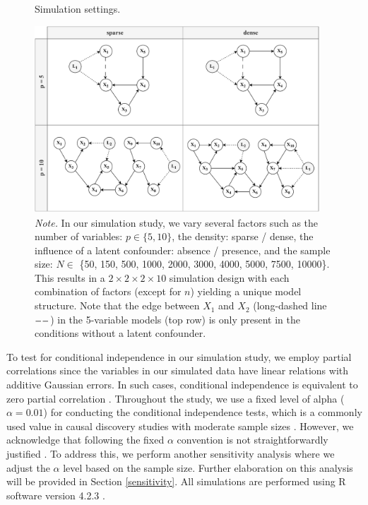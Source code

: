 \documentclass[twoside, 11pt]{article}
\newcommand{\thickdash}{%
\begin{tikzpicture}
[baseline=-0.7mm]
\draw [line width= 0.6pt, dash pattern={on 6pt off 2pt}] (0,0) -- (0.5,0);
\end{tikzpicture}
}
\begin{document}
\begin{figure}[!hb]
    \centering
        \caption{Simulation settings.}
        \includegraphics[width=0.95\textwidth]{figures/Fig11.pdf}
        \vspace*{1mm}
        \caption*{\small{\textit{Note.} In our simulation study, we vary several factors such as the number of variables: $p \in \{5, 10\}$, the density: sparse / dense, the influence of a latent confounder: absence / presence, and the sample size: $N \in$ \{50, 150, 500, 1000, 2000, 3000, 4000, 5000, 7500, 10000\}. This results in a $2 \times 2 \times 2 \times 10$ simulation design with each combination of factors (except for $n$) yielding a unique model structure. Note that the edge between $X_1$ and $X_2$ (long-dashed line $\thickdash$) in the 5-variable models (top row) is only present in the conditions without a latent confounder.}}
    \label{fig:11}
\end{figure}
 
\restoregeometry %

To test for conditional independence in our simulation study, we employ partial correlations since the variables in our simulated data have linear relations with additive Gaussian errors. In such cases, conditional independence is equivalent to zero partial correlation \citep{lawrance_conditional_1976}. Throughout the study, we use a fixed level of alpha ($\alpha = 0.01$) for conducting the conditional independence tests, which is a commonly used value in causal discovery studies with moderate sample sizes \citep{malinsky_causal_2018}. However, we acknowledge that following the fixed $\alpha$ convention is not straightforwardly justified \citep{strobl_estimating_2017}. To address this, we perform another sensitivity analysis where we adjust the $\alpha$ level based on the sample size. Further elaboration on this analysis will be provided in Section \ref{sensitivity}. All simulations are performed using R software version 4.2.3 \citep{R}.
\end{document}
